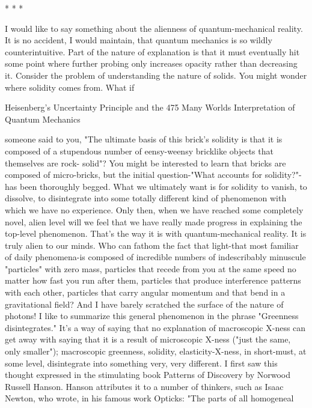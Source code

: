                                          *   *   *

        I would like to say something about the alienness of quantum-mechanical
reality. It is no accident, I would maintain, that quantum mechanics is so wildly
counterintuitive. Part of the nature of explanation is that it must eventually hit some
point where further probing only increases opacity rather than decreasing it. Consider
the problem of understanding the nature of solids. You might wonder where solidity
comes from. What if




Heisenberg's Uncertainty Principle and the                                             475
Many Worlds Interpretation of Quantum Mechanics

someone said to you, "The ultimate basis of this brick's solidity is that it is composed
of a stupendous number of eensy-weensy bricklike objects that themselves are rock-
solid"? You might be interested to learn that bricks are composed of micro-bricks, but
the initial question-"What accounts for solidity?"-has been thoroughly begged. What
we ultimately want is for solidity to vanish, to dissolve, to disintegrate into some
totally different kind of phenomenon with which we have no experience. Only then,
when we have reached some completely novel, alien level will we feel that we have
really made progress in explaining the top-level phenomenon.
        That's the way it is with quantum-mechanical reality. It is truly alien to our
minds. Who can fathom the fact that light-that most familiar of daily phenomena-is
composed of incredible numbers of indescribably minuscule "particles" with zero
mass, particles that recede from you at the same speed no matter how fast you run
after them, particles that produce interference patterns with each other, particles that
carry angular momentum and that bend in a gravitational field? And I have barely
scratched the surface of the nature of photons! I like to summarize this general
phenomenon in the phrase "Greenness disintegrates." It's a way of saying that no
explanation of macroscopic X-ness can get away with saying that it is a result of
microscopic X-ness ("just the same, only smaller"); macroscopic greenness, solidity,
elasticity-X-ness, in short-must, at some level, disintegrate into something very, very
different.
        I first saw this thought expressed in the stimulating book Patterns of Discovery
by Norwood Russell Hanson. Hanson attributes it to a number of thinkers, such as
Isaac Newton, who wrote, in his famous work Opticks: "The parts of all homogeneal
